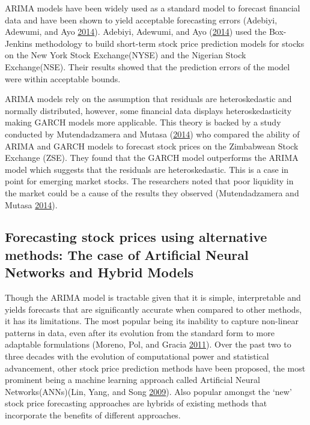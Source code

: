 \documentclass[12pt,preprint, authoryear]{elsarticle}
\numberwithin{equation}{section}
\numberwithin{figure}{section}
\numberwithin{table}{section}
\begin{document}
ARIMA models have been widely used as a standard model to forecast
financial data and have been shown to yield acceptable forecasting
errors (Adebiyi, Adewumi, and Ayo
\protect\hyperlink{ref-adebiyi2014comparison}{2014}). Adebiyi, Adewumi,
and Ayo (\protect\hyperlink{ref-adebiyi2014comparison}{2014}) used the
Box-Jenkins methodology to build short-term stock price prediction
models for stocks on the New York Stock Exchange(NYSE) and the Nigerian
Stock Exchange(NSE). Their results showed that the prediction errors of
the model were within acceptable bounds.

ARIMA models rely on the assumption that residuals are heteroskedastic
and normally distributed, however, some financial data displays
heteroskedasticity making GARCH models more applicable. This theory is
backed by a study conducted by Mutendadzamera and Mutasa
(\protect\hyperlink{ref-Muten2014}{2014}) who compared the ability of
ARIMA and GARCH models to forecast stock prices on the Zimbabwean Stock
Exchange (ZSE). They found that the GARCH model outperforms the ARIMA
model which suggests that the residuals are heteroskedastic. This is a
case in point for emerging market stocks. The researchers noted that
poor liquidity in the market could be a cause of the results they
observed (Mutendadzamera and Mutasa
\protect\hyperlink{ref-Muten2014}{2014}).

\subsection{Forecasting stock prices using alternative methods: The case
of Artificial Neural Networks and Hybrid
Models}\label{forecasting-stock-prices-using-alternative-methods-the-case-of-artificial-neural-networks-and-hybrid-models}

Though the ARIMA model is tractable given that it is simple,
interpretable and yields forecasts that are significantly accurate when
compared to other methods, it has its limitations. The most popular
being its inability to capture non-linear patterns in data, even after
its evolution from the standard form to more adaptable formulations
(Moreno, Pol, and Gracia
\protect\hyperlink{ref-moreno2011artificial}{2011}). Over the past two
to three decades with the evolution of computational power and
statistical advancement, other stock price prediction methods have been
proposed, the most prominent being a machine learning approach called
Artificial Neural Networks(ANNs)(Lin, Yang, and Song
\protect\hyperlink{ref-lin2009short}{2009}). Also popular amongst the
`new' stock price forecasting approaches are hybrids of existing methods
that incorporate the benefits of different approaches.
\end{document}
